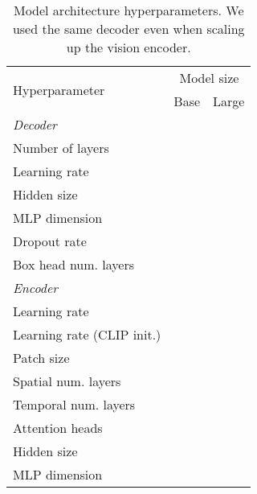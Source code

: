 \documentclass[10pt,twocolumn,letterpaper]{article}
\begin{document}
\begin{table}[t]
\centering
\caption{Model architecture hyperparameters. 
We used the same decoder even when scaling up the vision encoder.
}
\begin{tabular}{lcc}
\toprule
\multirow{2}{*}{Hyperparameter} & \multicolumn{2}{c}{Model size} \\
\cmidrule(l){2-3}
               & Base         & Large         \\
\midrule

\textit{Decoder} \\
Number of layers &  \multicolumn{2}{c}{} \\
Learning rate & \multicolumn{2}{c}{}  \\
Hidden size & \multicolumn{2}{c}{} \\
MLP dimension & \multicolumn{2}{c}{} \\
Dropout rate & \multicolumn{2}{c}{} \\
Box head num. layers & \multicolumn{2}{c}{} \vspace{0.5ex} \\

\textit{Encoder} \\
Learning rate &  &  \\
Learning rate (CLIP init.) & \multicolumn{2}{c}{} \\
Patch size &\multicolumn{2}{c}{} \\
Spatial num. layers &  &  \\
Temporal num. layers &  &  \\
Attention heads &  &  \\
Hidden size &  &  \\
MLP dimension &  &  \\
\bottomrule
\end{tabular}
\label{tab:architecture-details}
\end{table}
\end{document}

